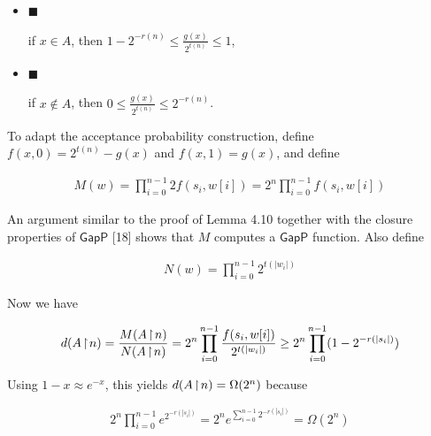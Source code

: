 \begin{itemize}


\item[] 
$\blacksquare$ 


if $x\in A$, then $1-2^{-r(n)}\leq\frac{g(x)}{2^{t(n)}}\leq 1$,\par





\item[] 
$\blacksquare$ 


if $x\notin A$, then $0\leq\frac{g(x)}{2^{t(n)}}\leq 2^{-r(n)}$.\par





\end{itemize}


To adapt the acceptance probability construction, define $f(x,0)=2^{t(n)}-g(x)$ and $f(x,1)=g(x)$, and define\par


\[\begin{gathered}
M(w)=\prod_{i=0}^{n-1}2f(s_{i},w[i])=2^{n}\prod_{i=0}^{n-1}f(s_{i},w[i])
\end{gathered}\]


An argument similar to the proof of Lemma 4.10 together with the closure properties of $\mathsf{GapP}$ [18] shows that $M$ computes a $\mathsf{GapP}$ function.
Also define\par


\[\begin{gathered}
N(w)=\prod_{i=0}^{n-1}2^{t(|w_{i}|)}
\end{gathered}\]


Now we have\par


\[\begin{gathered}
d(A\negthinspace\upharpoonright\negthinspace n)=\frac{M(A\negthinspace\upharpoonright\negthinspace n)}{N(A\negthinspace\upharpoonright\negthinspace n)}=2^{n}\prod_{i=0}^{n-1}\frac{f(s_{i},w[i])}{2^{t(|w_{i}|)}}\geq 2^{n}\prod_{i=0}^{n-1}(1-2^{-r(|s_{i}|)})
\end{gathered}\]


Using $1-x\approx e^{-x}$, this yields $d(A\negthinspace\upharpoonright\negthinspace n)=\Omega(2^{n})$ because\par


\[\begin{gathered}
2^{n}\prod_{i=0}^{n-1}e^{2^{-r(|s_{i}|)}}=2^{n}e^{\sum\limits_{i=0}^{n-1}2^{-r(|s_{i}|)}}=\Omega(2^{n})
\end{gathered}\]


